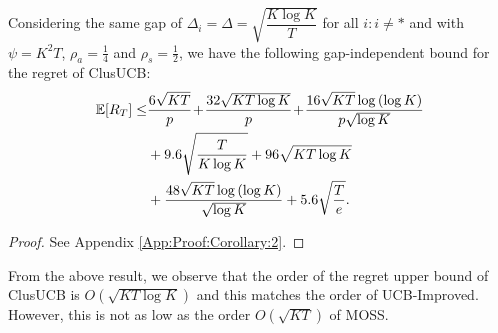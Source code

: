 \begin{corollary}
\label{Result:Corollary:2}
Considering the same gap of $\Delta_{i} = \Delta =\sqrt{\dfrac{K\log K}{T}}$ for all ${i:i\neq *}$ and with $\psi=K^{2}T$, $\rho_{a}=\frac{1}{4}$ and $\rho_{s}=\frac{1}{2}$, 
 we have the following gap-independent bound for the regret of ClusUCB:
\begin{align*}
\mathbb{E} [R_T] \le &
\frac{6\sqrt{KT}}{p} \!+\! \frac{32\sqrt{KT\log K}}{p} \!+\! \frac{16\sqrt{KT}\log{(\log K)}}{p\sqrt{\log K}}\\
&+ 9.6\sqrt{\frac{T}{K\log K}} + 96\sqrt{KT\log K}
 \\&  + \frac{48\sqrt{KT}\log{(\log K)}}{\sqrt{\log K}} + 5.6\sqrt{\frac{T}{e}}. 
\end{align*}
\end{corollary}
\begin{proof}
 See Appendix \ref{App:Proof:Corollary:2}.
\end{proof}


From the above result, we observe that the order of the regret upper bound of ClusUCB is $O(\sqrt{KT\log K})$ and this matches the order of UCB-Improved. However, this is not as low as the order $O(\sqrt{KT})$ of MOSS. 




